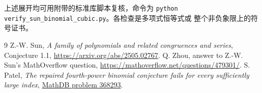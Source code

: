 \documentclass[11pt,UTF8,fontset=fandol]{ctexart}
\begin{document}
上述展开均可用附带的标准库脚本复核，命令为
\verb|python verify_sun_binomial_cubic.py|。各检查是多项式恒等式或
整个非负象限上的符号证书。

\begin{thebibliography}{9}
 Z.-W. Sun, \emph{A family of polynomials and related congruences and series},
Conjecture 1.1, \url{https://arxiv.org/abs/2505.02767}.
 Q. Zhou, answer to Z.-W. Sun's MathOverflow question,
\url{https://mathoverflow.net/questions/479301/}.
 S. Patel, \emph{The repaired fourth-power binomial conjecture fails for every sufficiently large index},
\href{https://mathdb.com/p/368293/sun-s-q-log-convexity-conjecture-for-binomial-sums-and-the-p}{MathDB problem 368293}.
\end{thebibliography}
\end{document}
